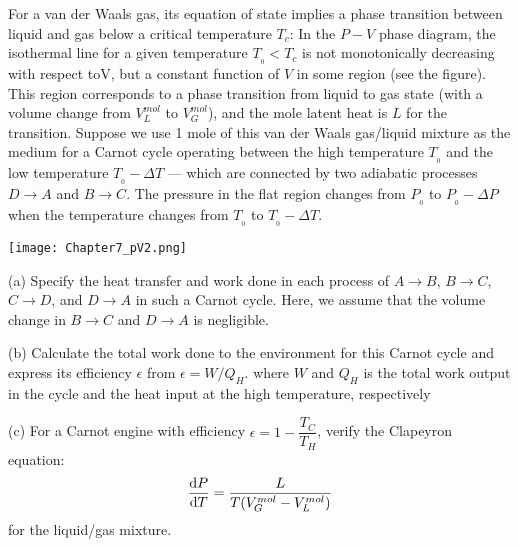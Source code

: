     \begin{example}
        For a van der Waals gas, its equation of state implies a phase transition between
        liquid and gas below a critical temperature $T_c$: In the $P-V$ phase
        diagram, the isothermal line for a given temperature $T_{_0} < T_{c}$ is not monotonically
        decreasing with respect toV, but a constant function of $V$ in some region (see the
        figure). This region corresponds to a phase transition from liquid to gas state (with a
        volume change from $V_{L}^{mol}$ to $V_{G}^{mol}$), and the mole latent heat is $L$ for the transition.
        Suppose we use 1 mole of this van der Waals gas/liquid mixture as the medium for
        a Carnot cycle operating between the high temperature $T_{_0}$ and the low temperature
        $T_{_0}-\Delta T$ — which are connected by two adiabatic processes $D\rightarrow A$ and $B\rightarrow C$.
        The pressure in the flat region changes from $P_{_0}$ to $P_{_0}-\Delta P$ when the temperature
        changes from $T_{_0}$ to $T_{_0}-\Delta T$.
        \begin{center}
            \texttt{[image: Chapter7\_pV2.png]}
        \end{center}

        (a) Specify the heat transfer and work done in each process of $A\rightarrow B$, $B\rightarrow C$,
        $C\rightarrow D$, and $D\rightarrow A$ in such a Carnot cycle. Here, we assume that the volume
        change in $B\rightarrow C$ and $D\rightarrow A$ is negligible.

        (b) Calculate the total work done to the environment for this Carnot cycle and express
        its efficiency $\epsilon$ from $\epsilon = W/Q_H$. where $W$ and $Q_H$ is the total work output in
        the cycle and the heat input at the high temperature, respectively

        (c) For a Carnot engine with efficiency $\epsilon = 1-\dfrac{T_C}{T_H}$, verify the Clapeyron equation:
        \begin{equation*}
            \frac{\mathrm{d}{P}}{\mathrm{d}{T}}=\frac{L}{T(V_{G}^{mol}-V_{L}^{mol})}
        \end{equation*}    
        for the liquid/gas mixture.
    \end{example}
